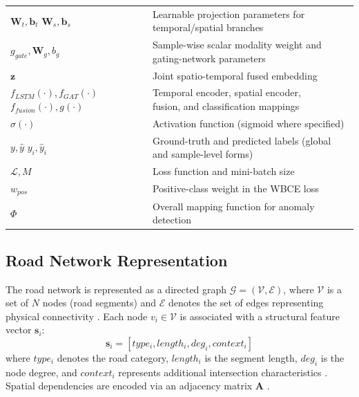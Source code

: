 \documentclass[journal]{IEEEtran}
\begin{document}
\begin{table}[!htbp]
\begin{tabular}{@{}p{}p{}@{}}
    \shortstack[l]{$\mathbf{W}_t, \mathbf{b}_t$\\$\mathbf{W}_s, \mathbf{b}_s$} & Learnable projection parameters for temporal/spatial branches \\
    $g_{gate}, \mathbf{W}_g, b_g$ & Sample-wise scalar modality weight and gating-network parameters \\
    $\mathbf{z}$ & Joint spatio-temporal fused embedding \\
    \shortstack[l]{$f_{LSTM}(\cdot), f_{GAT}(\cdot)$\\$f_{fusion}(\cdot), g(\cdot)$} & \shortstack[l]{Temporal encoder, spatial encoder,\\fusion, and classification mappings} \\
    $\sigma(\cdot)$ & Activation function (sigmoid where specified) \\
    \shortstack[l]{$y, \hat{y}$\\$y_i, \hat{y}_i$} & Ground-truth and predicted labels (global and sample-level forms) \\
    $\mathcal{L}, M$ & Loss function and mini-batch size \\
    $w_{pos}$ & Positive-class weight in the WBCE loss \\
    $\Phi$ & Overall mapping function for anomaly detection \\ \bottomrule
  \end{tabular}
\end{table}

\subsection{Road Network Representation}
The road network is represented as a directed graph $\mathcal{G} = (\mathcal{V}, \mathcal{E})$, where $\mathcal{V}$ is a set of $N$ nodes (road segments) and $\mathcal{E}$ denotes the set of edges representing physical connectivity \cite{li_graph_2023, park_graph_2025}. Each node $v_i \in \mathcal{V}$ is associated with a structural feature vector $\mathbf{s}_i$:
\begin{equation}
  \mathbf{s}_i = [type_i, length_i, deg_i, context_i]
\end{equation}
where $type_i$ denotes the road category, $length_i$ is the segment length, $deg_i$ is the node degree, and $context_i$ represents additional intersection characteristics \cite{chen_enhancing_2026, zhong_multi-factor_2025}. Spatial dependencies are encoded via an adjacency matrix $\mathbf{A}$ \cite{pan_dc-stgcn_2021, chang_stfdsgcn_2025}.
\end{document}
